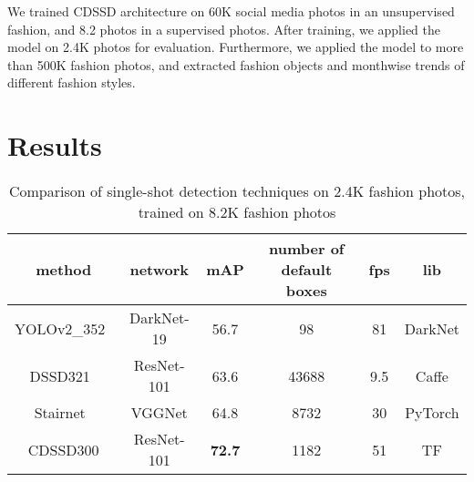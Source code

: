 \documentclass[sigconf]{acmart}
\begin{document}
We trained CDSSD architecture on 60K social media photos
in an unsupervised fashion, and 8.2 photos in a supervised
photos. After training, we applied the model on 2.4K photos
for evaluation. Furthermore, we applied the model to more than
500K fashion photos, and extracted fashion objects and monthwise
trends of different fashion styles.


\section{Results}
\label{results}

\begin{table*}
  \centering
  \caption{Comparison of single-shot detection techniques on 2.4K fashion photos,
           trained on 8.2K fashion photos}
\begin{tabular}{c | c c c c c}
method & network & mAP & number of default boxes & fps & lib \\
\hline
YOLOv2\_352~\cite{RedmonCVPR16} & DarkNet-19 & 56.7 & 98 & 81 & DarkNet \\
DSSD321~\cite{FuLRTB17} & ResNet-101 & 63.6 & 43688 & 9.5 & Caffe\\
Stairnet~\cite{stairnet17} & VGGNet & 64.8 & 8732 & 30 & PyTorch\\
CDSSD300 & ResNet-101 & \textbf{72.7} & 1182 & 51 & TF\\
\end{tabular}
  \label{tab:fashionphotosmap}
\end{table*}
\end{document}
